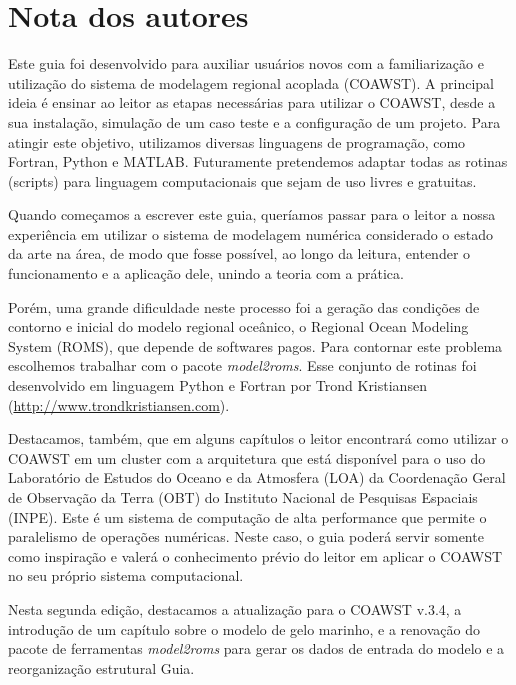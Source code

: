 \chapter*{Nota dos autores}
\bigskip
\noindent Este guia foi desenvolvido para auxiliar usuários novos com a familiarização e utilização do sistema 
          de modelagem regional acoplada (COAWST). A principal ideia é ensinar ao leitor as etapas necessárias 
          para utilizar o COAWST, desde a sua instalação, simulação de um caso teste e a configuração de um 
          projeto. Para atingir este objetivo, utilizamos diversas linguagens de programação, como Fortran, 
          Python e MATLAB. Futuramente pretendemos adaptar todas as rotinas (scripts) para linguagem computacionais 
          que sejam de uso livres e gratuitas.
\bigskip

\noindent Quando começamos a escrever este guia, queríamos passar para o leitor a nossa experiência em utilizar o 
          sistema de modelagem numérica considerado o estado da arte na área, de modo que fosse possível, ao longo 
          da leitura, entender o funcionamento e a aplicação dele, unindo a teoria com a prática.
\bigskip

\noindent Porém, uma grande dificuldade neste processo foi a geração das condições de contorno e inicial do modelo 
          regional oceânico, o Regional Ocean Modeling System (ROMS), que depende de softwares pagos. Para contornar este 
          problema escolhemos trabalhar com o pacote \textit{model2roms}. Esse conjunto de rotinas foi desenvolvido 
          em linguagem Python e Fortran por Trond Kristiansen 
          (\textcolor{bleu_cite}{\href{http://www.trondkristiansen.com}{http://www.trondkristiansen.com}}).
\bigskip

\noindent Destacamos, também, que em alguns capítulos o leitor encontrará como utilizar o COAWST em um cluster com
          a arquitetura que está disponível para o uso do Laboratório de Estudos do Oceano e da Atmosfera (LOA) da Coordenação
          Geral de Observação da Terra (OBT) do Instituto Nacional de Pesquisas Espaciais (INPE). Este é um sistema de 
          computação de alta performance que permite o paralelismo de operações numéricas. Neste caso, o guia poderá servir 
          somente como inspiração e valerá o conhecimento prévio do leitor em aplicar o COAWST no seu próprio sistema computacional.
\bigskip

\noindent Nesta segunda edição, destacamos a atualização para o COAWST v.3.4, a introdução de um capítulo sobre
          o modelo de gelo marinho, e a renovação do pacote de ferramentas \textit{model2roms} para 
          gerar os dados de entrada do modelo e a reorganização estrutural Guia.
\bigskip
\pagebreak 

